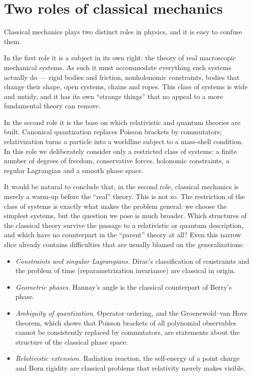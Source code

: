 
\section{Two roles of classical mechanics}
\label{sec:two-roles}

Classical mechanics plays two distinct roles in physics, and it is easy to
confuse them.

In the first role it is a subject in its own right: the theory of real
macroscopic mechanical systems. As such it must accommodate everything
such systems actually do --- rigid bodies and friction, nonholonomic
constraints, bodies that change their shape, open systems, chains and
ropes. This class of systems is wide and untidy, and it has its own
``strange things'' that no appeal to a more fundamental theory can remove.

In the second role it is the base on which relativistic and quantum
theories are built. Canonical quantization replaces Poisson brackets by
commutators; relativization turns a particle into a worldline subject to
a mass-shell condition. In this role we deliberately consider only a
restricted class of systems: a finite number of degrees of freedom,
conservative forces, holonomic constraints, a regular Lagrangian and a
smooth phase space.

It would be natural to conclude that, in the second role, classical
mechanics is merely a warm-up before the ``real'' theory. This is not so.
The restriction of the class of systems is exactly what makes the problem
general: we choose the simplest systems, but the question we pose is much
broader. Which structures of the classical theory survive the passage to
a relativistic or quantum description, and which have no counterpart in
the ``parent'' theory at all? Even this narrow slice already contains
difficulties that are usually blamed on the generalizations:

\begin{itemize}
  \item \emph{Constraints and singular Lagrangians.} Dirac's
    classification of constraints and the problem of time
    (reparametrization invariance) are classical in origin.
  \item \emph{Geometric phases.} Hannay's angle is the classical
    counterpart of Berry's phase.
  \item \emph{Ambiguity of quantization.} Operator ordering, and the
    Groenewold--van Hove theorem, which shows that Poisson brackets of
    all polynomial observables cannot be consistently replaced by
    commutators, are statements about the structure of the classical
    phase space.
  \item \emph{Relativistic extension.} Radiation reaction, the
    self-energy of a point charge and Born rigidity are classical
    problems that relativity merely makes visible.
\end{itemize}

